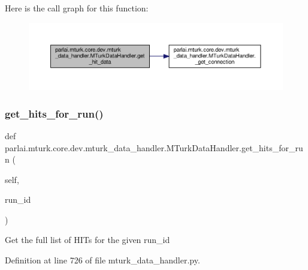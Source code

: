 Here is the call graph for this function\+:
\nopagebreak
\begin{figure}[H]
\begin{center}
\leavevmode
\includegraphics[width=350pt]{classparlai_1_1mturk_1_1core_1_1dev_1_1mturk__data__handler_1_1MTurkDataHandler_aac6a98f191bfacfb9092f2d0138fb429_cgraph}
\end{center}
\end{figure}
\mbox{\label{classparlai_1_1mturk_1_1core_1_1dev_1_1mturk__data__handler_1_1MTurkDataHandler_a9effb9b4fadb19804787129f064f23a2}} 
\subsubsection{\texorpdfstring{get\+\_\+hits\+\_\+for\+\_\+run()}{get\_hits\_for\_run()}}
{\footnotesize\ttfamily def parlai.\+mturk.\+core.\+dev.\+mturk\+\_\+data\+\_\+handler.\+M\+Turk\+Data\+Handler.\+get\+\_\+hits\+\_\+for\+\_\+run (\begin{DoxyParamCaption}\item[{}]{self,  }\item[{}]{run\+\_\+id }\end{DoxyParamCaption})}

\begin{DoxyVerb}Get the full list of HITs for the given run_id\end{DoxyVerb}
 

Definition at line 726 of file mturk\+\_\+data\+\_\+handler.\+py.



